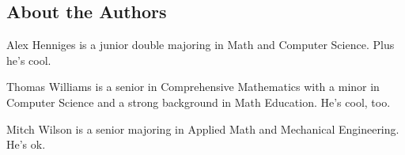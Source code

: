 \documentclass[12pt]{article}
\begin{document}
  \newpage
  \subsection*{About the Authors}
  \maketitle
  
  Alex Henniges is a junior double majoring in Math and Computer Science. Plus he's cool. \newline
  
  \noindent Thomas Williams is a senior in Comprehensive Mathematics with a minor in Computer Science and a strong background in Math Education. He's cool, too. \newline
  
  \noindent Mitch Wilson is a senior majoring in Applied Math and Mechanical Engineering. He's ok. 
\end{document}
